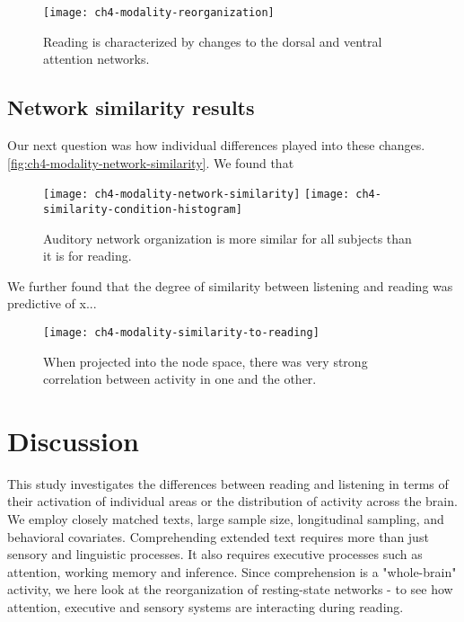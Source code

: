 \begin{figure}[t]
	\centering
	\texttt{[image: ch4-modality-reorganization]}
    \caption[Network-level changes between listening and reading.]{Reading is characterized by changes to the dorsal and ventral attention networks.}
	\label{fig:ch4-modality-reorganization}
\end{figure}

\subsection{Network similarity results}

Our next question was how individual differences played into these changes. 
\ref{fig:ch4-modality-network-similarity}. We found that 

\begin{figure}[t]
	\centering
	\texttt{[image: ch4-modality-network-similarity]}
	\texttt{[image: ch4-similarity-condition-histogram]}
    \caption[Auditory network organization is more similar for all subjects than it is for reading.]{Auditory network organization is more similar for all subjects than it is for reading.}
	\label{fig:modality-network-similarity}
\end{figure}

We further found that the degree of similarity between listening and reading was predictive of x...

\begin{figure}[t]
	\centering
	\texttt{[image: ch4-modality-similarity-to-reading]}
    \caption[Network similarity between listening and reading predicts word efficiency.]{When projected into the node space, there was very strong correlation between activity in one and the other.}
	\label{fig:ch4-modality-similarity-to-reading}
\end{figure}




\section{Discussion}

This study investigates the differences between reading and listening in terms of their activation of individual areas or the distribution of activity across the brain. We employ closely matched texts, large sample size, longitudinal sampling, and behavioral covariates. Comprehending extended text requires more than just sensory and linguistic processes. It also requires executive processes such as attention, working memory and inference. Since comprehension is a "whole-brain" activity, we here look at the reorganization of resting-state networks - to see how attention, executive and sensory systems are interacting during reading.

